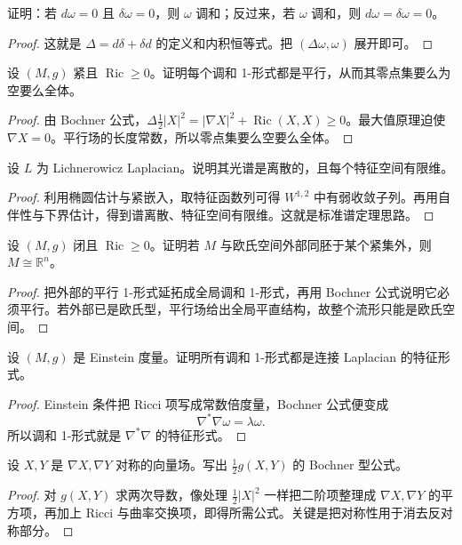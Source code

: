 \documentclass[11pt,a4paper,openany]{ctexbook}
\numberwithin{equation}{chapter}
\begin{document}
\begin{exercise}
证明：若 \(d\omega=0\) 且 \(\delta\omega=0\)，则 \(\omega\) 调和；反过来，若 \(\omega\) 调和，则 \(d\omega=\delta\omega=0\)。
\end{exercise}
\begin{proof}
这就是 \(\Delta=d\delta+\delta d\) 的定义和内积恒等式。把 \((\Delta\omega,\omega)\) 展开即可。
\end{proof}

\begin{exercise}
设 \((M,g)\) 紧且 \(\operatorname{Ric}\ge 0\)。证明每个调和 1-形式都是平行，从而其零点集要么为空要么全体。
\end{exercise}
\begin{proof}
由 Bochner 公式，\(\Delta \frac12|X|^2=|\nabla X|^2+\operatorname{Ric}(X,X)\ge 0\)。最大值原理迫使 \(\nabla X=0\)。平行场的长度常数，所以零点集要么空要么全体。
\end{proof}

\begin{exercise}
设 \(L\) 为 Lichnerowicz Laplacian。说明其光谱是离散的，且每个特征空间有限维。
\end{exercise}
\begin{proof}
利用椭圆估计与紧嵌入，取特征函数列可得 \(W^{1,2}\) 中有弱收敛子列。再用自伴性与下界估计，得到谱离散、特征空间有限维。这就是标准谱定理思路。
\end{proof}

\begin{exercise}
设 \((M,g)\) 闭且 \(\operatorname{Ric}\ge 0\)。证明若 \(M\) 与欧氏空间外部同胚于某个紧集外，则 \(M\cong\mathbb R^n\)。
\end{exercise}
\begin{proof}
把外部的平行 1-形式延拓成全局调和 1-形式，再用 Bochner 公式说明它必须平行。若外部已是欧氏型，平行场给出全局平直结构，故整个流形只能是欧氏空间。
\end{proof}

\begin{exercise}
设 \((M,g)\) 是 Einstein 度量。证明所有调和 1-形式都是连接 Laplacian 的特征形式。
\end{exercise}
\begin{proof}
Einstein 条件把 Ricci 项写成常数倍度量，Bochner 公式便变成
\[
\nabla^*\nabla\omega=\lambda\omega.
\]
所以调和 1-形式就是 \(\nabla^*\nabla\) 的特征形式。
\end{proof}

\begin{exercise}
设 \(X,Y\) 是 \(\nabla X,\nabla Y\) 对称的向量场。写出 \( \frac12 g(X,Y)\) 的 Bochner 型公式。
\end{exercise}
\begin{proof}
对 \(g(X,Y)\) 求两次导数，像处理 \(\frac12|X|^2\) 一样把二阶项整理成 \(\nabla X,\nabla Y\) 的平方项，再加上 Ricci 与曲率交换项，即得所需公式。关键是把对称性用于消去反对称部分。
\end{proof}
\end{document}
